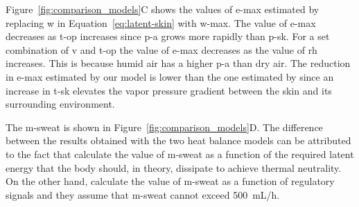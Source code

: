Figure~\ref{fig:comparison_models}C shows the values of \ac{e-max} estimated by replacing \ac{w} in Equation~\ref{eq:latent-skin} with \ac{w-max}.
The value of \ac{e-max} decreases as \ac{t-op} increases since \ac{p-a} grows more rapidly than \ac{p-sk}.
For a set combination of \ac{v} and \ac{t-op} the value of \ac{e-max} decreases as the value of \ac{rh} increases.
This is because humid air has a higher \ac{p-a} than dry air.
The reduction in \ac{e-max} estimated by our model is lower than the one estimated by  since an increase in \ac{t-sk} elevates the vapor pressure gradient between the skin and its surrounding environment.

The \acf{m-sweat} is shown in Figure~\ref{fig:comparison_models}D\@.
The difference between the results obtained with the two heat balance models can be attributed to the fact that \citeauthor{Jay2015} calculate the value of \ac{m-sweat} as a function of the required latent energy that the body should, in theory, dissipate to achieve thermal neutrality.
On the other hand, \citeauthor{GaggeSET} calculate the value of \ac{m-sweat} as a function of regulatory signals and they assume that \ac{m-sweat} cannot exceed 500~mL/h.



